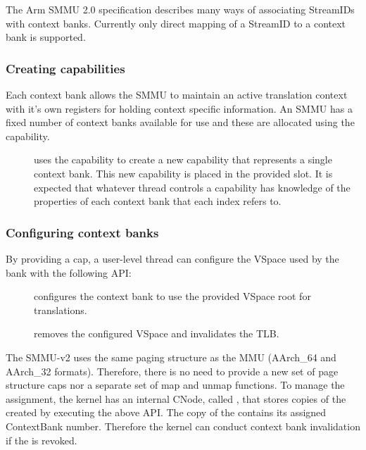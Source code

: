 The Arm SMMU 2.0 specification describes many ways of associating StreamIDs with
context banks. Currently only direct mapping of a StreamID to a context bank is
supported.

\subsubsection{Creating  capabilities}
\label{sec:smmuv2-creating-sel4-arm-cb-capabilities}

Each context bank allows the SMMU to maintain an active translation context with
it's own registers for holding context specific information. An SMMU has a fixed
number of context banks available for use and these are allocated using the
 capability.

\begin{description}

\item[] uses the
     capability to create a new 
    capability that represents a single context bank.  This new capability is
    placed in the provided slot.  It is expected that whatever thread controls a
     capability has knowledge of the properties of each
    context bank that each index refers to.
\end{description}


\subsubsection{Configuring context banks}
\label{sec:smmuv2-configuring-context-banks}

By providing a  cap, a user-level thread can configure the
VSpace used by the bank with the following API:

\begin{description}
    \item[] configures
        the context bank to use the provided VSpace root for translations.
    \item[] removes
        the configured VSpace and invalidates the TLB.
\end{description}

The SMMU-v2 uses the same paging structure as the MMU (AArch\_64 and AArch\_32
formats). Therefore, there is no need to provide a new set of page structure caps
nor a separate set of map and unmap functions. To manage the assignment, the
kernel has an internal CNode, called , that stores copies of the
 created by executing the above API. The copy of the
 contains its assigned ContextBank number. Therefore the kernel
can conduct context bank invalidation if the  is revoked.



